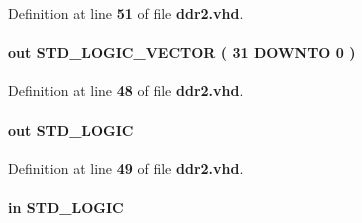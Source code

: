 Definition at line {\bf 51} of file {\bf ddr2.\+vhd}.

\paragraph[{local\+\_\+rdata}]{ {\bfseries \textcolor{keywordflow}{out}\textcolor{vhdlchar}{ }} {\bfseries \textcolor{comment}{S\+T\+D\+\_\+\+L\+O\+G\+I\+C\+\_\+\+V\+E\+C\+T\+OR}\textcolor{vhdlchar}{ }\textcolor{vhdlchar}{(}\textcolor{vhdlchar}{ }\textcolor{vhdlchar}{ } \textcolor{vhdldigit}{31} \textcolor{vhdlchar}{ }\textcolor{keywordflow}{D\+O\+W\+N\+TO}\textcolor{vhdlchar}{ }\textcolor{vhdlchar}{ } \textcolor{vhdldigit}{0} \textcolor{vhdlchar}{ }\textcolor{vhdlchar}{)}\textcolor{vhdlchar}{ }} \hspace{0.3cm}{\ttfamily [Port]}}\label{classddr2_a66664f6e84042468589e036c0f233f04}


Definition at line {\bf 48} of file {\bf ddr2.\+vhd}.

\paragraph[{local\+\_\+rdata\+\_\+valid}]{ {\bfseries \textcolor{keywordflow}{out}\textcolor{vhdlchar}{ }} {\bfseries \textcolor{comment}{S\+T\+D\+\_\+\+L\+O\+G\+IC}\textcolor{vhdlchar}{ }} \hspace{0.3cm}{\ttfamily [Port]}}\label{classddr2_a3e1688446ec7f7d64f39672bcbadd094}


Definition at line {\bf 49} of file {\bf ddr2.\+vhd}.

\paragraph[{local\+\_\+read\+\_\+req}]{ {\bfseries \textcolor{keywordflow}{in}\textcolor{vhdlchar}{ }} {\bfseries \textcolor{comment}{S\+T\+D\+\_\+\+L\+O\+G\+IC}\textcolor{vhdlchar}{ }} \hspace{0.3cm}{\ttfamily [Port]}}\label{classddr2_a65c3b904ecf7838309a865ee600d9f79}


